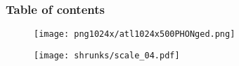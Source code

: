 \date{\today} 

\begin{frame}
\titlepage
\end{frame}

\begin{frame}\frametitle{Table of contents}\tableofcontents
\end{frame} 


\begin{frame}
\begin{figure}
	\centering
	\texttt{[image: png1024x/atl1024x500PHONged.png]}
\end{figure}
\end{frame}

\begin{frame}
\begin{figure}
	\centering
	\texttt{[image: shrunks/scale\_04.pdf]}
\end{figure}
\end{frame}
